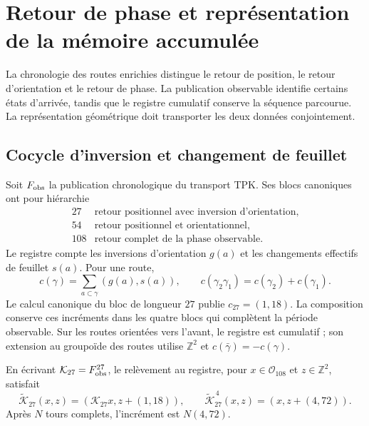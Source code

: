 \chapter{Retour de phase et représentation de la mémoire accumulée}
\label{x_reciprocidad:vii:sec:retorno-memoria-gravedad}

La chronologie des routes enrichies distingue le retour de position,
le retour d'orientation et le retour de phase. La publication observable
identifie certains états d'arrivée, tandis que le registre cumulatif
conserve la séquence parcourue. La représentation géométrique doit
transporter les deux données conjointement.

\section{Cocycle d'inversion et changement de feuillet}
\label{x_reciprocidad:vii:subsec:cociclo-memoria}

Soit \(F_{\rm obs}\) la publication chronologique du transport TPK.
Ses blocs canoniques ont pour hiérarchie
\[
\begin{array}{c|l}
27&\text{retour positionnel avec inversion d'orientation},\\
54&\text{retour positionnel et orientationnel},\\
108&\text{retour complet de la phase observable}.
\end{array}
\]
Le registre compte les inversions d'orientation \(g(a)\) et les
changements effectifs de feuillet \(s(a)\). Pour une route,
\begin{equation}
 c(\gamma)=\sum_{a\subset\gamma}(g(a),s(a)),\qquad
 c(\gamma_2\gamma_1)=c(\gamma_2)+c(\gamma_1).
 \label{x_reciprocidad:vii:eq:cociclo-ruta}
\end{equation}
Le calcul canonique du bloc de longueur \(27\) publie
\(c_{27}=(1,18)\). La composition conserve ces incréments dans
les quatre blocs qui complètent la période observable.
Sur les routes orientées vers l'avant, le registre est cumulatif ;
son extension au groupoïde des routes utilise \(\mathbb Z^2\) et
\(c(\bar\gamma)=-c(\gamma)\).

\begin{proposition}
\label{x_reciprocidad:vii:prop:memoria-vuelta-completa}
En écrivant \(\mathcal K_{27}=F_{\rm obs}^{27}\), le relèvement
au registre, pour \(x\in\mathcal O_{108}\) et \(z\in\mathbb Z^2\), satisfait
\[
 \widetilde{\mathcal K}_{27}(x,z)
   =(\mathcal K_{27}x,z+(1,18)),\qquad
 \widetilde{\mathcal K}_{27}^{\,4}(x,z)
   =(x,z+(4,72)).
\]
Après \(N\) tours complets, l'incrément est \(N(4,72)\).
\end{proposition}


